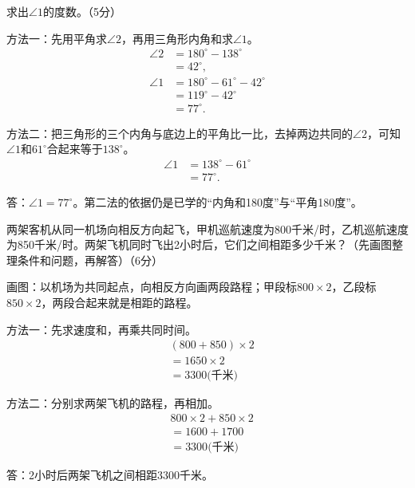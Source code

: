 求出\(\angle1\)的度数。（5分）\par
{}
\begin{BookAnswer}
方法一：先用平角求\(\angle2\)，再用三角形内角和求\(\angle1\)。\[\begin{aligned}\angle2&=180^\circ-138^\circ\\&=42^\circ,\\\angle1&=180^\circ-61^\circ-42^\circ\\&=119^\circ-42^\circ\\&=77^\circ.\end{aligned}\]\par 方法二：把三角形的三个内角与底边上的平角比一比，去掉两边共同的\(\angle2\)，可知\(\angle1\)和\(61^\circ\)合起来等于\(138^\circ\)。\[\begin{aligned}\angle1&=138^\circ-61^\circ\\&=77^\circ.\end{aligned}\]\par 答：\(\angle1=77^\circ\)。第二法的依据仍是已学的“内角和180度”与“平角180度”。
\end{BookAnswer}

两架客机从同一机场向相反方向起飞，甲机巡航速度为800千米/时，乙机巡航速度为850千米/时。两架飞机同时飞出2小时后，它们之间相距多少千米？（先画图整理条件和问题，再解答）（6分）\par
\begin{BookAnswer}
画图：以机场为共同起点，向相反方向画两段路程；甲段标\(800\times2\)，乙段标\(850\times2\)，两段合起来就是相距的路程。\par 方法一：先求速度和，再乘共同时间。\[\begin{aligned}&(800+850)\times2\\&=1650\times2\\&=3300\text{(千米)}\end{aligned}\]\par 方法二：分别求两架飞机的路程，再相加。\[\begin{aligned}&800\times2+850\times2\\&=1600+1700\\&=3300\text{(千米)}\end{aligned}\]\par 答：2小时后两架飞机之间相距3300千米。
\end{BookAnswer}


